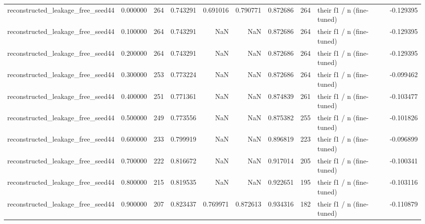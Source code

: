 \begin{tabular}{lrrrrrrrlr}
reconstructed_leakage_free_seed44 & 0.000000 & 264 & 0.743291 & 0.691016 & 0.790771 & 0.872686 & 264 & their f1 / n (fine-tuned) & -0.129395 \\
reconstructed_leakage_free_seed44 & 0.100000 & 264 & 0.743291 & NaN & NaN & 0.872686 & 264 & their f1 / n (fine-tuned) & -0.129395 \\
reconstructed_leakage_free_seed44 & 0.200000 & 264 & 0.743291 & NaN & NaN & 0.872686 & 264 & their f1 / n (fine-tuned) & -0.129395 \\
reconstructed_leakage_free_seed44 & 0.300000 & 253 & 0.773224 & NaN & NaN & 0.872686 & 264 & their f1 / n (fine-tuned) & -0.099462 \\
reconstructed_leakage_free_seed44 & 0.400000 & 251 & 0.771361 & NaN & NaN & 0.874839 & 261 & their f1 / n (fine-tuned) & -0.103477 \\
reconstructed_leakage_free_seed44 & 0.500000 & 249 & 0.773556 & NaN & NaN & 0.875382 & 255 & their f1 / n (fine-tuned) & -0.101826 \\
reconstructed_leakage_free_seed44 & 0.600000 & 233 & 0.799919 & NaN & NaN & 0.896819 & 223 & their f1 / n (fine-tuned) & -0.096899 \\
reconstructed_leakage_free_seed44 & 0.700000 & 222 & 0.816672 & NaN & NaN & 0.917014 & 205 & their f1 / n (fine-tuned) & -0.100341 \\
reconstructed_leakage_free_seed44 & 0.800000 & 215 & 0.819535 & NaN & NaN & 0.922651 & 195 & their f1 / n (fine-tuned) & -0.103116 \\
reconstructed_leakage_free_seed44 & 0.900000 & 207 & 0.823437 & 0.769971 & 0.872613 & 0.934316 & 182 & their f1 / n (fine-tuned) & -0.110879 \\
\bottomrule
\end{tabular}
